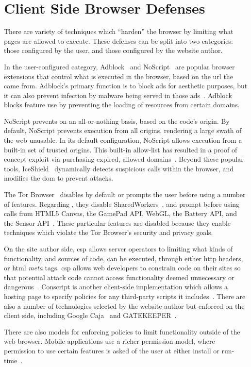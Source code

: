 \section{Client Side Browser Defenses}
\label{background:related-browser-defs}

There are variety of techniques which ``harden'' the browser
by limiting what \JS pages are allowed to execute. These defenses can
be split into two categories: those configured by the user, and those
configured by the website author.

In the user-configured category, Adblock~\cite{adblockplus} and
NoScript~\cite{noscriptwebsite} are popular browser
extensions that control what \JS is executed in the browser, based on the
\gls{url} the \JS came from.  Adblock's primary
function is to block ads for aesthetic purposes, but it can also prevent
infection by malware being served in those
ads~\cite{forbes-malware,engadget-malware}.  Adblock blocks feature use by
preventing the loading of resources from certain domains.

NoScript prevents \JS on an
all-or-nothing basis, based on the code's origin.  By default, NoScript prevents
\JS execution from all origins, rendering a large swath of the web unusable.
In its default configuration, NoScript allows \JS execution from a built-in set
of trusted origins.  This built-in allow-list has resulted in a proof of
concept exploit via purchasing expired, allowed
domains~\cite{noscript_whitelist}.  Beyond these popular tools,
IceShield~\cite{heiderich2011iceshield} dynamically detects suspicious \JS
calls within the browser, and modifies the \gls{dom} to prevent attacks.

The Tor Browser~\cite{dingledine2004tor} disables by default or prompts the
user before using a number of features.  Regarding \JS, they disable
SharedWorkers~\cite{webworkersw3c}, and prompt before using calls from HTML5
Canvas, the GamePad API, WebGL, the Battery API, and the Sensor
API~\cite{tor-features}.  These particular features are disabled because they
enable techniques which violate the Tor Browser's security and privacy goals.

On the site author side, \gls{csp} allows server operators to limiting what
kinds of \JS functionality, and sources of code, can be executed, through
either \gls{http} headers, or \gls{html} \textit{meta} tags.
\gls{csp} allows web developers to constrain code on their
sites so that potential attack code cannot access functionality deemed
unnecessary or dangerous~\cite{stamm2010reining}.  Conscript is another
client-side implementation which allows a hosting page to specify policies for
any third-party scripts it includes~\cite{meyerovich2010conscript}.  There are
also a number of technologies selected by the website author but enforced on
the client side,  including Google Caja~\cite{google13caja} and
GATEKEEPER~\cite{guarnieri09gatekeeper}.

There are also models for enforcing policies to limit functionality outside
of the web browser.  Mobile applications use a richer permission model,
where permission to use certain features is asked of the user at either install
or run-time~\cite{android-permissions,au2011short}.
